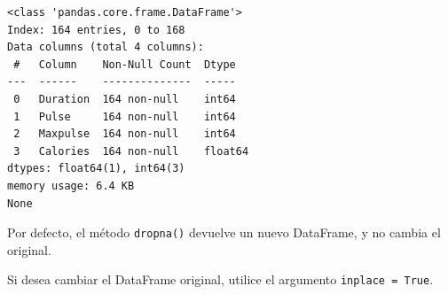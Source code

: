 \begin{code}
\begin{verbatim}
<class 'pandas.core.frame.DataFrame'>
Index: 164 entries, 0 to 168
Data columns (total 4 columns):
 #   Column    Non-Null Count  Dtype  
---  ------    --------------  -----  
 0   Duration  164 non-null    int64  
 1   Pulse     164 non-null    int64  
 2   Maxpulse  164 non-null    int64  
 3   Calories  164 non-null    float64
dtypes: float64(1), int64(3)
memory usage: 6.4 KB
None
\end{verbatim}
\end{code}

Por defecto, el método \texttt{dropna()} devuelve un nuevo DataFrame, y
no cambia el original.

Si desea cambiar el DataFrame original, utilice el argumento
\texttt{inplace\ =\ True}.\\

